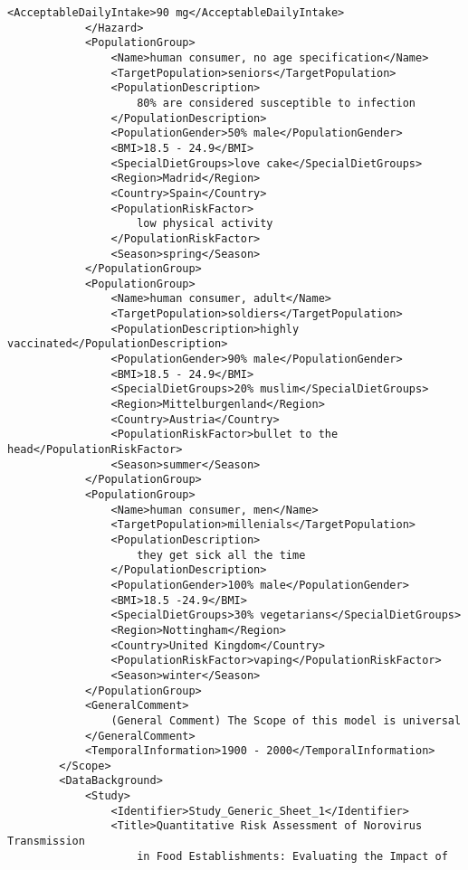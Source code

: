 \begin{lstlisting}[language=RAKIP, caption={Example of GenericModel}]
                <AcceptableDailyIntake>90 mg</AcceptableDailyIntake>
            </Hazard>
            <PopulationGroup>
                <Name>human consumer, no age specification</Name>
                <TargetPopulation>seniors</TargetPopulation>
                <PopulationDescription>
                    80% are considered susceptible to infection
                </PopulationDescription>
                <PopulationGender>50% male</PopulationGender>
                <BMI>18.5 - 24.9</BMI>
                <SpecialDietGroups>love cake</SpecialDietGroups>
                <Region>Madrid</Region>
                <Country>Spain</Country>
                <PopulationRiskFactor>
                    low physical activity
                </PopulationRiskFactor>
                <Season>spring</Season>
            </PopulationGroup>
            <PopulationGroup>
                <Name>human consumer, adult</Name>
                <TargetPopulation>soldiers</TargetPopulation>
                <PopulationDescription>highly vaccinated</PopulationDescription>
                <PopulationGender>90% male</PopulationGender>
                <BMI>18.5 - 24.9</BMI>
                <SpecialDietGroups>20% muslim</SpecialDietGroups>
                <Region>Mittelburgenland</Region>
                <Country>Austria</Country>
                <PopulationRiskFactor>bullet to the head</PopulationRiskFactor>
                <Season>summer</Season>
            </PopulationGroup>
            <PopulationGroup>
                <Name>human consumer, men</Name>
                <TargetPopulation>millenials</TargetPopulation>
                <PopulationDescription>
                    they get sick all the time
                </PopulationDescription>
                <PopulationGender>100% male</PopulationGender>
                <BMI>18.5 -24.9</BMI>
                <SpecialDietGroups>30% vegetarians</SpecialDietGroups>
                <Region>Nottingham</Region>
                <Country>United Kingdom</Country>
                <PopulationRiskFactor>vaping</PopulationRiskFactor>
                <Season>winter</Season>
            </PopulationGroup>
            <GeneralComment>
                (General Comment) The Scope of this model is universal
            </GeneralComment>
            <TemporalInformation>1900 - 2000</TemporalInformation>
        </Scope>
        <DataBackground>
            <Study>
                <Identifier>Study_Generic_Sheet_1</Identifier>
                <Title>Quantitative Risk Assessment of Norovirus Transmission
                    in Food Establishments: Evaluating the Impact of

\end{lstlisting}
